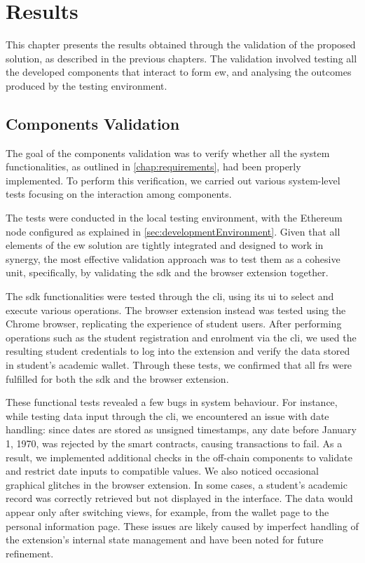 \chapter{Results}
\label{chap:results}
This chapter presents the results obtained through the validation of the proposed solution, as described in the previous chapters. The validation involved testing all the developed components that interact to form \gls{ew}, and analysing the outcomes produced by the testing environment.

\section{Components Validation}
\label{sec:componentsValidation}
The goal of the components validation was to verify whether all the system functionalities, as outlined in \cref{chap:requirements}, had been properly implemented. To perform this verification, we carried out various system-level tests focusing on the interaction among components.

The tests were conducted in the local testing environment, with the Ethereum node configured as explained in \cref{sec:developmentEnvironment}. Given that all elements of the \gls{ew} solution are tightly integrated and designed to work in synergy, the most effective validation approach was to test them as a cohesive unit, specifically, by validating the \gls{sdk} and the browser extension together.

The \gls{sdk} functionalities were tested through the \gls{cli}, using its \gls{ui} to select and execute various operations. The browser extension instead was tested using the Chrome browser, replicating the experience of student users. After performing operations such as the student registration and enrolment via the \gls{cli}, we used the resulting student credentials to log into the extension and verify the data stored in student's academic wallet. Through these tests, we confirmed that all \glspl{fr} were fulfilled for both the \gls{sdk} and the browser extension.

These functional tests revealed a few bugs in system behaviour. For instance, while testing data input through the \gls{cli}, we encountered an issue with date handling: since dates are stored as unsigned timestamps, any date before January 1, 1970, was rejected by the smart contracts, causing transactions to fail. As a result, we implemented additional checks in the off-chain components to validate and restrict date inputs to compatible values. We also noticed occasional graphical glitches in the browser extension. In some cases, a student’s academic record was correctly retrieved but not displayed in the interface. The data would appear only after switching views, for example, from the wallet page to the personal information page.  These issues are likely caused by imperfect handling of the extension’s internal state management and have been noted for future refinement.


